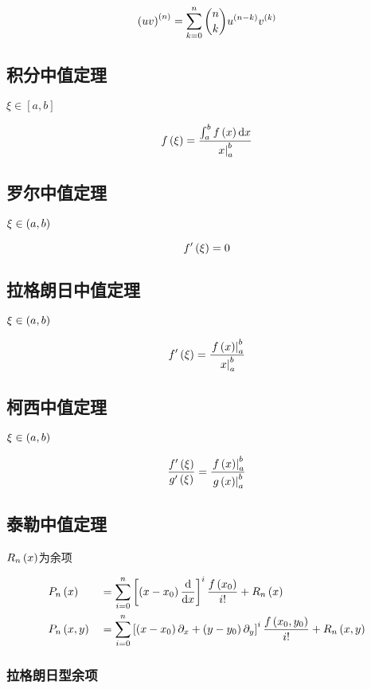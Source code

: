 \documentclass{article}
\begin{document}
\[\left(uv\right)^{\left(n\right)}=\sum_{k=0}^n\binom nku^{\left(n-k\right)}v^{\left(k\right)}\]

\subsection{积分中值定理}

$\xi\in\left[a,b\right]$

\[f\left(\xi\right)=\frac{\int_a^bf\left(x\right)\mathrm d x}{\left.x\right|_a^b}\]

\subsection{罗尔中值定理}

$\xi\in\left(a,b\right)$

\[f^\prime\left(\xi\right)=0\]

\subsection{拉格朗日中值定理}

$\xi\in\left(a,b\right)$

\[f^\prime\left(\xi\right)=\frac{\left.f\left(x\right)\right|_a^b}{\left.x\right|_a^b}\]

\subsection{柯西中值定理}

$\xi\in\left(a,b\right)$

\[\frac{f^\prime\left(\xi\right)}{g^\prime\left(\xi\right)}=\frac{\left.f\left(x\right)\right|_a^b}{\left.g\left(x\right)\right|_a^b}\]

\subsection{泰勒中值定理}

$R_n\left(x\right)$为余项

\[\begin{aligned}
         & P_n\left(x\right)    &  & =\sum_{i=0}^n\left[\left(x-x_0\right)\frac{\mathrm d}{\mathrm d x}\right]^i\frac{f\left(x_0\right)}{i!}+R_n\left(x\right)                                   \\
         & P_n\left(x,y\right) &  & =\sum_{i=0}^n\left[\left(x-x_0\right)\partial_x+\left(y-y_0\right)\partial_y\right]^i\frac{f\left(x_0,y_0\right)}{i!}+R_n\left(x,y\right)\label{2}
    \end{aligned}\]

\subsubsection{拉格朗日型余项}
\end{document}
